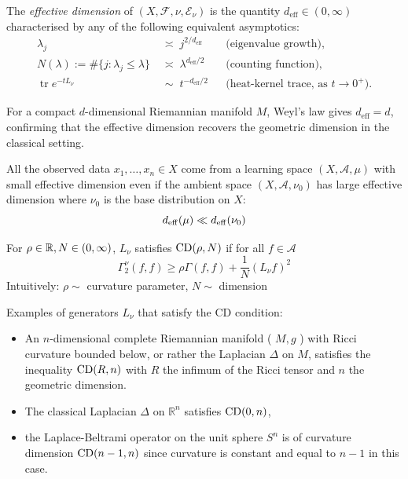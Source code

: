 \documentclass{article}
\begin{document}
\begin{definition}
	The \emph{effective dimension} of $(X,\mathcal{F},\nu,\mathcal{E}_\nu)$ is
	the quantity $d_{\mathrm{eff}}\in(0,\infty)$ characterised by any of the
	following equivalent asymptotics:
	\begin{align*}
		\lambda_j & \;\asymp\; j^{2/d_{\mathrm{eff}}}
		          &                                         & \text{(eigenvalue growth)},                     \\
		N(\lambda) := \#\{j:\lambda_j\le\lambda\}
		          & \;\asymp\; \lambda^{d_{\mathrm{eff}}/2}
		          &                                         & \text{(counting function)},                     \\
		\operatorname{tr} e^{-tL_\nu}
		          & \;\sim\; t^{-d_{\mathrm{eff}}/2}
		          &                                         & \text{(heat-kernel trace, as }t\to 0^+\text{)}.
	\end{align*}
\end{definition}

For a compact $d$-dimensional Riemannian manifold $M$, Weyl's law gives
$d_{\mathrm{eff}} = d$, confirming that the effective dimension recovers the
geometric dimension in the classical setting.



\begin{assumption}
	All the observed data $x_1, \ldots, x_n \in X$ come from a learning space $(X, \mathcal{A}, \mu)$ with small effective dimension even if the ambient space $(X, \mathcal{A}, \nu_0)$ has large effective dimension where $\nu_0$ is the base distribution on $X$:
	\[
		d_{\mathrm{eff}}(\mu) \ll d_{\mathrm{eff}}(\nu_0)
	\]
\end{assumption}



\begin{definition}\label{def:cd}
	For $\rho \in \mathbb{R}, N \in (0, \infty)$, $L_{\nu}$ satisfies $\mathrm{CD}(\rho, N)$ if for all $f \in \mathcal{A}$
	$$\Gamma_2^{\nu}(f, f) \geq \rho \Gamma(f, f)+ \frac{1}{N} \left(L_{\nu} f\right)^2$$
	Intuitively: $\rho \sim$  curvature parameter, $N \sim$ dimension
\end{definition}

\begin{example}
	Examples of generators $L_{\nu}$ that satisfy the CD condition:
	\begin{itemize}
		\item An $n$-dimensional complete Riemannian manifold ( $M, g$ ) with Ricci curvature bounded below, or rather the Laplacian $\Delta$ on $M$, satisfies the inequality $\mathrm{CD}(R, n)$ with $R$ the infimum of the Ricci tensor and $n$ the geometric dimension.
		\item  The classical Laplacian $\Delta$ on $\mathbb{R}^n$ satisfies $\mathrm{CD}(0, n)$,
		\item  the Laplace-Beltrami operator on the unit sphere $S^n$ is of curvature dimension $\mathrm{CD}(n-1, n)$ since curvature is constant and equal to $n-1$ in this case.
	\end{itemize}
\end{example}
\end{document}
